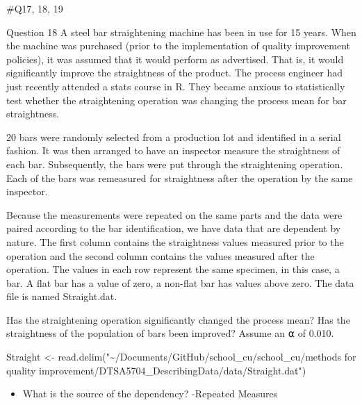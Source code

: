 \documentclass[
]{article}
\newenvironment{Shaded}{\begin{snugshade}}{\end{snugshade}}
\newcommand{\AttributeTok}[1]{\textcolor[rgb]{0.77,0.63,0.00}{#1}}
\newcommand{\FunctionTok}[1]{\textcolor[rgb]{0.00,0.00,0.00}{#1}}
\newcommand{\NormalTok}[1]{#1}
\newcommand{\OtherTok}[1]{\textcolor[rgb]{0.56,0.35,0.01}{#1}}
\newcommand{\SpecialCharTok}[1]{\textcolor[rgb]{0.00,0.00,0.00}{#1}}
\newcommand{\StringTok}[1]{\textcolor[rgb]{0.31,0.60,0.02}{#1}}
\providecommand{\tightlist}{%
  \setlength{\itemsep}{0pt}\setlength{\parskip}{0pt}}
\begin{document}
\#Q17, 18, 19

Question 18 A steel bar straightening machine has been in use for 15
years. When the machine was purchased (prior to the implementation of
quality improvement policies), it was assumed that it would perform as
advertised. That is, it would significantly improve the straightness of
the product. The process engineer had just recently attended a stats
course in R. They became anxious to statistically test whether the
straightening operation was changing the process mean for bar
straightness.

20 bars were randomly selected from a production lot and identified in a
serial fashion. It was then arranged to have an inspector measure the
straightness of each bar. Subsequently, the bars were put through the
straightening operation. Each of the bars was remeasured for
straightness after the operation by the same inspector.

Because the measurements were repeated on the same parts and the data
were paired according to the bar identification, we have data that are
dependent by nature. The first column contains the straightness values
measured prior to the operation and the second column contains the
values measured after the operation. The values in each row represent
the same specimen, in this case, a bar. A flat bar has a value of zero,
a non-flat bar has values above zero. The data file is named
Straight.dat.

Has the straightening operation significantly changed the process mean?
Has the straightness of the population of bars been improved? Assume an
⍺ of 0.010.

\begin{Shaded}
\begin{Highlighting}[]
\NormalTok{Straight }\OtherTok{\textless{}{-}} \FunctionTok{read.delim}\NormalTok{(}\StringTok{"\textasciitilde{}/Documents/GitHub/school\_cu/school\_cu/methods for quality improvement/DTSA5704\_DescribingData/data/Straight.dat"}\NormalTok{)}
\end{Highlighting}
\end{Shaded}

\begin{itemize}
\tightlist
\item
  What is the source of the dependency? -Repeated Measures
\end{itemize}

\begin{Shaded}
\end{Shaded}
\end{document}
